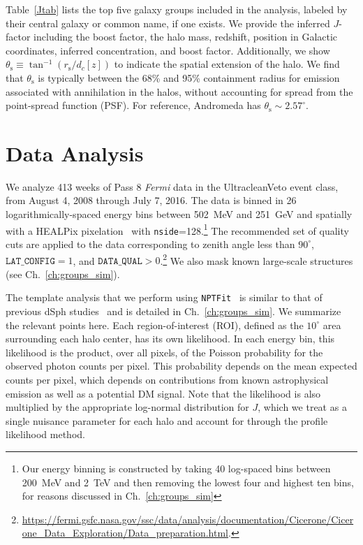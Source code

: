 Table~\ref{Jtab} lists the top five galaxy groups included in the analysis, labeled by their central galaxy or common name, if one exists.  We provide the inferred $J$-factor including the boost factor, the halo mass, redshift, position in Galactic coordinates, inferred concentration, and boost factor.  Additionally, we show $\theta_\text{s} \equiv \tan^{-1} (r_\text{s} / d_c[z])$ to indicate the spatial extension of the halo.  We find that $\theta_\text{s}$ is typically between the 68\% and 95\% containment radius for emission associated with annihilation in the halos, without accounting for spread from the point-spread function (PSF).  For reference, Andromeda has $\theta_\text{s} \sim 2.57^\circ$.  

\section{Data Analysis}

We analyze 413 weeks of Pass 8 {\it Fermi} data in the UltracleanVeto event class, from August 4, 2008 through July 7, 2016.  The data is binned in 26 logarithmically-spaced energy bins between 502~MeV and 251~GeV and spatially with a HEALPix pixelation~\cite{Gorski:2004by} with \texttt{nside}=128.\footnote{Our energy binning is constructed by taking 40 log-spaced bins between 200~MeV and 2~TeV and then removing the lowest four and highest ten bins, for reasons discussed in Ch.~\ref{ch:groups_sim} }  The recommended set of quality cuts are applied to the data corresponding to zenith angle less than $90^\circ$, $\texttt{LAT\_CONFIG}=1$, and $\texttt{DATA\_QUAL}>0$.\footnote{\url{https://fermi.gsfc.nasa.gov/ssc/data/analysis/documentation/Cicerone/Cicerone_Data_Exploration/Data_preparation.html}.}  We also mask known large-scale structures (see Ch.~\ref{ch:groups_sim}).

The template analysis that we perform using \texttt{NPTFit}~\cite{Mishra-Sharma:2016gis} is similar to that of previous dSph studies~\cite{Ackermann:2015zua,Fermi-LAT:2016uux}  and is detailed in Ch.~\ref{ch:groups_sim}.  We summarize the relevant points here.  Each region-of-interest (ROI), defined as the $10^\circ$ area surrounding each halo center, has its own likelihood.  In each energy bin, this  likelihood is the product, over all pixels, of the Poisson probability for the observed photon counts per pixel.  This probability depends on the mean expected counts per pixel, which depends on contributions from known astrophysical emission as well as a potential DM signal. Note that the likelihood is also multiplied by the appropriate log-normal distribution for $J$, which we treat as a single nuisance parameter for each halo and account for through the profile likelihood method.  

